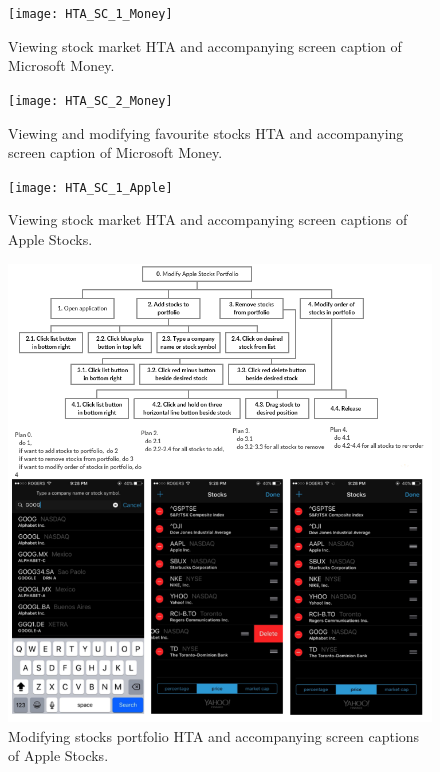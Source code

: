 \documentclass{sigchi}
\begin{document}
\begin{figure}
	\texttt{[image: HTA\_SC\_1\_Money]}
	\caption{Viewing stock market HTA and accompanying screen caption of Microsoft Money.}
	\label{fig:figure1}
\end{figure}

\begin{figure}
	\texttt{[image: HTA\_SC\_2\_Money]}
	\caption{Viewing and modifying favourite stocks HTA and accompanying screen caption of Microsoft Money.}
	\label{fig:figure2}
\end{figure}


\begin{figure}
	\begin{center}
		\texttt{[image: HTA\_SC\_1\_Apple]}
	\end{center}
	\caption{Viewing stock market HTA and accompanying screen captions of Apple Stocks.}
	\label{fig:figure3}
\end{figure}

\begin{figure}
	\includegraphics[width=\textwidth]{HTA_SC_2_Apple}
	\caption{Modifying stocks portfolio HTA and accompanying screen captions of Apple Stocks.}
	\label{fig:figure4}
\end{figure}
\end{document}
